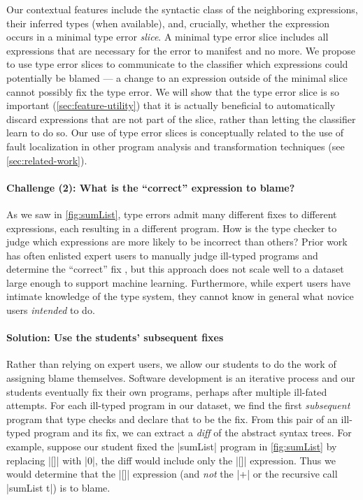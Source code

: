 Our contextual features include the syntactic class of the neighboring
expressions, their inferred types (when available), and, crucially, whether
the expression occurs in a minimal type error \emph{slice}.
%
A minimal type error slice \citep{Haack2003-vc} includes all expressions that
are necessary for the error to manifest and no more.
%
We propose to use type error slices to communicate to the classifier
which expressions could potentially be blamed --- a change to an
expression outside of the minimal slice cannot possibly fix the type
error.
%
We will show that the type error slice is so important
(\autoref{sec:feature-utility}) that it is actually beneficial to
automatically discard expressions that are not part of the slice, rather
than letting the classifier learn to do so.
%
Our use of type error slices is conceptually related to the use of fault
localization in other program analysis and transformation techniques
(see \autoref{sec:related-work}).

\paragraph{\textbf{Challenge (2): What is the ``correct'' expression to blame?}}
As we saw in \autoref{fig:sumList}, type errors admit many different
fixes to different expressions, each resulting in a different program.
%
How is the type checker to judge which expressions are more likely to be
incorrect than others?
%
Prior work has often enlisted expert users to manually judge ill-typed
programs and determine the ``correct'' fix
\citep[\eg][]{Loncaric2016-uk}, but this approach does not scale well to
a dataset large enough to support machine learning.
%
Furthermore, while expert users have intimate knowledge of the type system,
they cannot know in general what novice users \emph{intended} to do.

\paragraph{\textbf{Solution: Use the students' subsequent fixes}}
%
Rather than relying on expert users, we allow our students to do the
work of assigning blame themselves.
%
Software development is an iterative process and our students 
eventually fix their own programs, perhaps after multiple ill-fated
attempts.
%
For each ill-typed program in our dataset, we find the first
\emph{subsequent} program that type checks and declare that to be the
fix.
%
From this pair of an ill-typed program and its fix, we can extract a
\emph{diff} of the abstract syntax trees.
%
For example, suppose our student fixed the |sumList| program in
\autoref{fig:sumList} by replacing |[]| with |0|, the diff would include
only the |[]| expression.
%
Thus we would determine that the |[]| expression (and \emph{not} the
|+| or the recursive call |sumList t|) is to blame.


